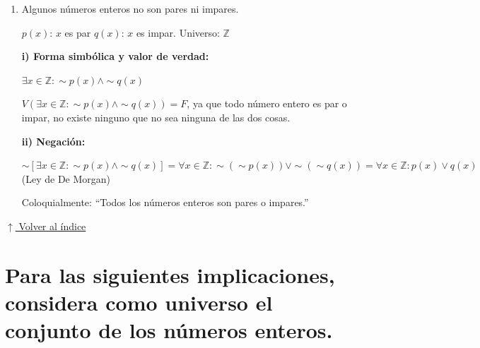 \documentclass[12pt]{article}
\newcommand{\volverindice}{%
    \vspace{1em}%
    \begin{flushright}%
        \hyperlink{indice}{\small $\uparrow$ Volver al índice}%
    \end{flushright}%
}
\begin{document}
\begin{enumerate}[label=\alph*.-]
    Por definición, un número primo es $> 1$, $\therefore$ no puede ser negativo.

    $p(x)$: $x$ es primo \quad $q(x)$: $x$ es negativo. \quad Universo: $\mathbb{Z}$

    \textbf{i) Forma simbólica y valor de verdad:}

    $\exists x \in \mathbb{Z}: p(x) \wedge q(x)$

    $V(\exists x \in \mathbb{Z}: p(x) \wedge q(x)) = F$, ya que ningún número primo es negativo por definición.

    \textbf{ii) Negación:}

    $\sim\left[\exists x \in \mathbb{Z}: p(x) \wedge q(x)\right] = \forall x \in \mathbb{Z}: \sim p(x) \vee \sim q(x)$ \quad (Ley de De Morgan)

    Coloquialmente: ``Todo número o no es primo o no es negativo.''

    \newpage

    \item Algunos números enteros no son pares ni impares.

    $p(x)$: $x$ es par \quad $q(x)$: $x$ es impar. \quad Universo: $\mathbb{Z}$

    \textbf{i) Forma simbólica y valor de verdad:}

    $\exists x \in \mathbb{Z}: \sim p(x) \wedge \sim q(x)$

    $V(\exists x \in \mathbb{Z}: \sim p(x) \wedge \sim q(x)) = F$, ya que todo número entero es par o impar, no existe ninguno que no sea ninguna de las dos cosas.

    \textbf{ii) Negación:}

    $\sim\left[\exists x \in \mathbb{Z}: \sim p(x) \wedge \sim q(x)\right] = \forall x \in \mathbb{Z}: \sim(\sim p(x)) \vee \sim(\sim q(x)) = \forall x \in \mathbb{Z}: p(x) \vee q(x)$ \quad (Ley de De Morgan)

    Coloquialmente: ``Todos los números enteros son pares o impares.''
\end{enumerate}

\volverindice
\newpage


\section[Implicaciones: análisis y equivalencias]{Para las siguientes implicaciones, considera como universo el conjunto de los números enteros.}
\end{document}

